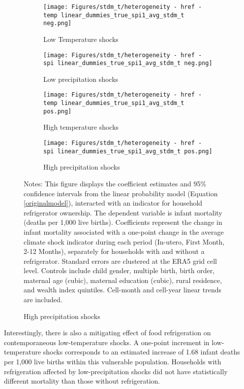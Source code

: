 \documentclass[a4paper]{article}
\begin{document}
\begin{figure}[t!]
    \caption{Preserving food is key}
    \begin{center}
    \label{fig:refrigeration_heterogeneity}
    \begin{subfigure}[t]{0.4\textwidth}
        \centering
        \texttt{[image: Figures/stdm\_t/heterogeneity - href - temp linear\_dummies\_true\_spi1\_avg\_stdm\_t neg.png]}
        \caption{Low Temperature shocks}
    \end{subfigure}%
    \begin{subfigure}[t]{0.4\textwidth}
        \centering
        \texttt{[image: Figures/stdm\_t/heterogeneity - href - spi linear\_dummies\_true\_spi1\_avg\_stdm\_t neg.png]}
        \caption{Low precipitation shocks}
    \end{subfigure} \hfill
    \begin{subfigure}[t]{0.4\textwidth}
        \centering
        \texttt{[image: Figures/stdm\_t/heterogeneity - href - temp linear\_dummies\_true\_spi1\_avg\_stdm\_t pos.png]}
        \caption{High temperature shocks}    
    \end{subfigure}
    \begin{subfigure}[t]{0.4\textwidth}
        \centering
        \texttt{[image: Figures/stdm\_t/heterogeneity - href - spi linear\_dummies\_true\_spi1\_avg\_stdm\_t pos.png]}
        \caption{High precipitation shocks}    
    \end{subfigure}
    \end{center}
    \footnotesize{Notes: This figure displays the coefficient estimates and 95\% confidence intervals from the linear probability model (Equation \ref{originalmodel}), interacted with an indicator for household refrigerator ownership. The dependent variable is infant mortality (deaths per 1,000 live births). Coefficients represent the change in infant mortality associated with a one-point change in the average climate shock indicator during each period (In-utero, First Month, 2-12 Months), separately for households with and without a refrigerator. Standard errors are clustered at the ERA5 grid cell level. Controls include child gender, multiple birth, birth order, maternal age (cubic), maternal education (cubic), rural residence, and wealth index quintiles. Cell-month and cell-year linear trends are included.}
\end{figure}

Interestingly, there is also a mitigating effect of food refrigeration on contemporaneous low-temperature shocks. A one-point increment in low-temperature shocks corresponds to an estimated increase of 1.68 infant deaths per 1,000 live births within this vulnerable population. Households with refrigeration affected by low-precipitation shocks did not have statistically different mortality than those without refrigeration.
\end{document}
